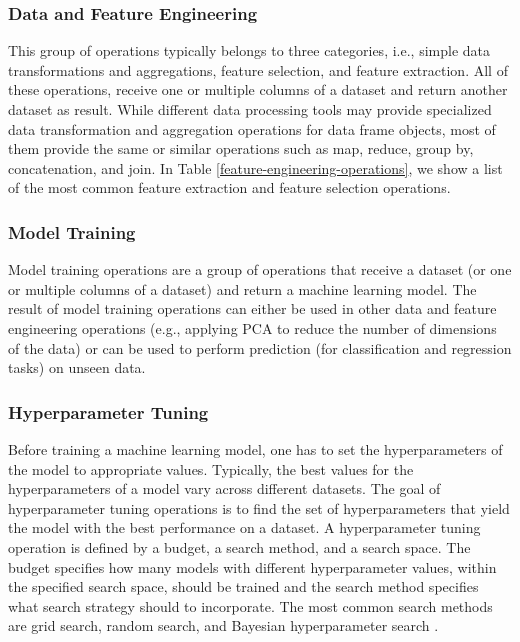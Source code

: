 \subsubsection{Data and Feature Engineering}
This group of operations typically belongs to three categories, i.e., simple data transformations and aggregations, feature selection, and feature extraction.
All of these operations, receive one or multiple columns of a dataset and return another dataset as result. 
While different data processing tools may provide specialized data transformation and aggregation operations for data frame objects, most of them provide the same or similar operations such as map, reduce, group by, concatenation, and join. 
In Table \ref{feature-engineering-operations}, we show a list of the most common feature extraction and feature selection operations.

\subsubsection{Model Training}
Model training operations are a group of operations that receive a dataset (or one or multiple columns of a dataset) and return a machine learning model.
The result of model training operations can either be used in other data and feature engineering operations (e.g., applying PCA to reduce the number of dimensions of the data) or can be used to perform prediction (for classification and regression tasks) on unseen data.

\subsubsection{Hyperparameter Tuning}
Before training a machine learning model, one has to set the hyperparameters of the model to appropriate values.
Typically, the best values for the hyperparameters of a model vary across different datasets.
The goal of hyperparameter tuning operations is to find the set of hyperparameters that yield the model with the best performance on a dataset.
A hyperparameter tuning operation is defined by a budget, a search method, and a search space.
The budget specifies how many models with different hyperparameter values, within the specified search space, should be trained and the search method specifies what search strategy should to incorporate.
The most common search methods are grid search, random search, and Bayesian hyperparameter search \cite{bergstra2012random,snoek2012practical}.

